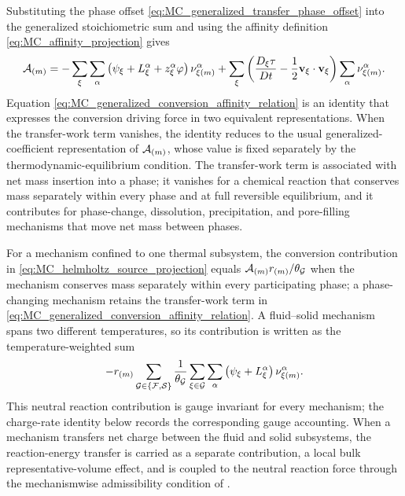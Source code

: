 Substituting the phase offset
\eqref{eq:MC_generalized_transfer_phase_offset} into the generalized
stoichiometric sum and using the affinity definition
\eqref{eq:MC_affinity_projection} gives
%
\begin{equation}
	\mathcal{A}_{(m)}
	=
	-
	\sum_\xi\sum_\alpha
	\left(
		\psi_\xi+L_\xi^\alpha+z_\xi^\alpha\varphi
	\right)
	\nu_{\xi (m)}^\alpha
	+
	\sum_\xi
	\left(
		\frac{D_\xi\tau}{Dt}
		-
		\frac{1}{2}
		\mathbf{v}_\xi\cdot\mathbf{v}_\xi
	\right)
	\sum_\alpha\nu_{\xi (m)}^\alpha .
	\label{eq:MC_generalized_conversion_affinity_relation}
\end{equation}
%
Equation \eqref{eq:MC_generalized_conversion_affinity_relation} is an identity
that expresses the conversion driving force in two equivalent representations.
When the transfer-work term vanishes, the identity reduces to the usual
generalized-coefficient representation of \(\mathcal{A}_{(m)}\), whose value is
fixed separately by the thermodynamic-equilibrium condition.  The
transfer-work term is associated with net mass insertion into a phase; it
vanishes for a chemical reaction that conserves mass separately within every
phase and at full reversible equilibrium, and it contributes for
phase-change, dissolution, precipitation, and pore-filling mechanisms that
move net mass between phases.

For a mechanism confined to one thermal subsystem, the conversion contribution
in \eqref{eq:MC_helmholtz_source_projection} equals
\(\mathcal{A}_{(m)}r_{(m)}/\theta_{\mathcal{G}}\) when the mechanism conserves mass
separately within every participating phase; a phase-changing mechanism
retains the transfer-work term in
\eqref{eq:MC_generalized_conversion_affinity_relation}.  A fluid--solid
mechanism spans two different temperatures, so its contribution is written as
the temperature-weighted sum
%
\begin{equation}
	-
	r_{(m)}
	\sum_{\mathcal{G}\in\{\mathcal{F},\mathcal{S}\}}
	\frac{1}{\theta_{\mathcal{G}}}
	\sum_{\xi\in\mathcal{G}}\sum_\alpha
	\left(
	\psi_\xi+L_\xi^\alpha
	\right)
	\nu_{\xi (m)}^\alpha .
	\label{eq:MC_temperature_weighted_reaction_power}
\end{equation}
%
This neutral reaction contribution is gauge invariant for every mechanism;
the charge-rate identity below records the corresponding gauge accounting.
When a mechanism transfers net charge between the fluid and solid subsystems,
the reaction-energy transfer is carried as a separate contribution, a local
bulk representative-volume effect, and is coupled to the neutral reaction
force through the mechanismwise admissibility condition of
.

